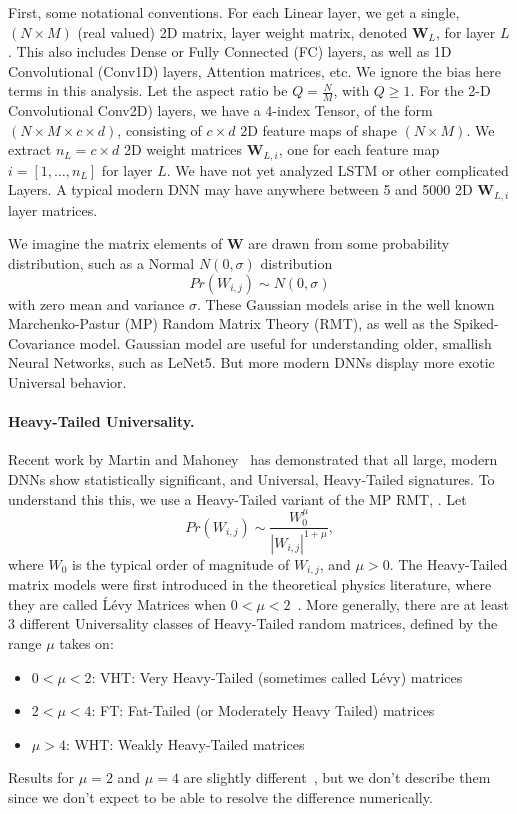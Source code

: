 First, some notational conventions.
For each Linear layer, we get a  single, $(N\times M)$ (real valued) 2D matrix, layer weight matrix, denoted $\mathbf{W}_{L}$, for layer $L$.  
This also includes Dense or Fully Connected (FC) layers, as well as 1D Convolutional (Conv1D) layers, Attention matrices, etc.
We ignore the bias here terms in this analysis.  Let the aspect ratio be $Q=\frac{N}{M}$, with $Q\ge 1$.
For the 2-D Convolutional Conv2D) layers, we have a 4-index Tensor, of the form $(N\times M \times c\times d)$, consisting
of $c\times d$ 2D feature maps of shape $(N\times M)$.    
We  extract $n_{L}=c\times d$  2D  weight matrices $\mathbf{W}_{L,i}$, one for each feature map $i=[1,\dots,n_{L}]$ for layer $L$.
We have not yet analyzed LSTM or other complicated Layers. 
A typical modern DNN may have anywhere between 5 and 5000 2D $\mathbf{W}_{L,i}$ layer matrices.
   
We imagine the matrix elements of $\mathbf{W}$  are drawn from some probability distribution, such as a Normal $N(0,\sigma)$ distribution
$$
Pr(W_{i,j})\sim N(0,\sigma)
$$
with zero mean and variance $\sigma$.   
These Gaussian models arise in the well known Marchenko-Pastur (MP) Random Matrix Theory (RMT), as well as the Spiked-Covariance model. 
Gaussian model are useful for understanding older, smallish Neural Networks, such as LeNet5.
But more modern DNNs display more exotic Universal behavior.  


\paragraph{Heavy-Tailed Universality.} 
Recent work by Martin and Mahoney~\cite{MM18_TR} 
has demonstrated that all large, modern DNNs show statistically significant, and Universal, Heavy-Tailed signatures.  
To understand this this, we use a Heavy-Tailed variant of the MP RMT, .
Let 
$$
Pr(W_{i,j})\sim\dfrac{W_{0}^{\mu}}{|W_{i,j}|^{1+\mu}}  ,
$$
where $W_{0}$ is the typical order of magnitude of $W_{i,j}$, and $\mu>0$. 
The Heavy-Tailed matrix models were first introduced in the theoretical physics literature, where they are called \'L\'evy Matrices when $0<\mu<2$~\cite{PB94}.
More generally, there are at least 3 different Universality classes of Heavy-Tailed random matrices, defined by the range $\mu$ takes on:
\begin{itemize}
\item $0<\mu<2$: VHT:  Very Heavy-Tailed (sometimes called L\'evy) matrices
\item $2<\mu<4$: FT:  Fat-Tailed (or Moderately Heavy Tailed) matrices
\item $\mu>4$: WHT:  Weakly Heavy-Tailed matrices
\end{itemize}
Results for $\mu=2$ and $\mu=4$ are slightly different~\cite{SornetteBook,BouchaudPotters03}, but we don't describe them since we don't expect to be able to resolve the difference numerically.

